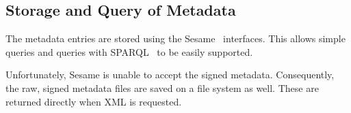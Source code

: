 \subsection{Storage and Query of Metadata}

The metadata entries are stored using the Sesame~\cite{jena}
interfaces.  This allows simple queries and queries with SPARQL~\cite{sparql}
 to be easily supported.

Unfortunately, Sesame is unable to accept the signed metadata.
Consequently, the raw, signed metadata files are saved on
a file system as well.  These are returned directly when XML is
requested.
